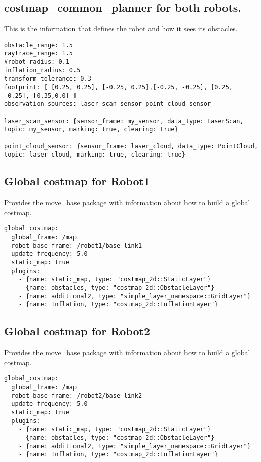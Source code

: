 \subsection{costmap\_common\_planner for both robots.}
This is the information that defines the robot and how it sees its obstacles.
\begin{lstlisting}
obstacle_range: 1.5
raytrace_range: 1.5
#robot_radius: 0.1
inflation_radius: 0.5
transform_tolerance: 0.3
footprint: [ [0.25, 0.25], [-0.25, 0.25],[-0.25, -0.25], [0.25, -0.25], [0.35,0.0] ]
observation_sources: laser_scan_sensor point_cloud_sensor

laser_scan_sensor: {sensor_frame: my_sensor, data_type: LaserScan, topic: my_sensor, marking: true, clearing: true}

point_cloud_sensor: {sensor_frame: laser_cloud, data_type: PointCloud, topic: laser_cloud, marking: true, clearing: true}
\end{lstlisting}

\subsection{Global costmap for Robot1}
Provides the move\_base package with information about how to build a global costmap.
\begin{lstlisting}
global_costmap:
  global_frame: /map
  robot_base_frame: /robot1/base_link1
  update_frequency: 5.0
  static_map: true
  plugins:
    - {name: static_map, type: "costmap_2d::StaticLayer"}
    - {name: obstacles, type: "costmap_2d::ObstacleLayer"}
    - {name: additional2, type: "simple_layer_namespace::GridLayer"}
    - {name: Inflation, type: "costmap_2d::InflationLayer"}
\end{lstlisting}

\subsection{Global costmap for Robot2}
Provides the move\_base package with information about how to build a global costmap.
\begin{lstlisting}
global_costmap:
  global_frame: /map
  robot_base_frame: /robot2/base_link2
  update_frequency: 5.0
  static_map: true
  plugins:
    - {name: static_map, type: "costmap_2d::StaticLayer"}
    - {name: obstacles, type: "costmap_2d::ObstacleLayer"}
    - {name: additional2, type: "simple_layer_namespace::GridLayer"}
    - {name: Inflation, type: "costmap_2d::InflationLayer"}
\end{lstlisting}

